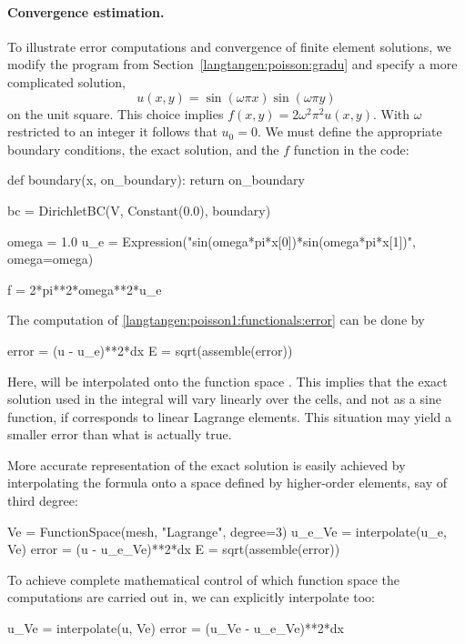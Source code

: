 \paragraph{Convergence estimation.}
To illustrate error computations and convergence of finite element
solutions, we modify the  program from
Section~\ref{langtangen:poisson:gradu} and specify a more complicated
solution,
\begin{equation}
   u(x,y) = \sin(\omega\pi x)\sin(\omega\pi y)
\end{equation}
on the unit square.  This choice implies $f(x,y)=2\omega^2\pi^2 u(x,y)$.
With $\omega$ restricted to an integer it follows that $u_0=0$. We must
define the appropriate boundary conditions, the exact solution, and the
$f$ function in the code:
\begin{python}
def boundary(x, on_boundary):
    return on_boundary

bc = DirichletBC(V, Constant(0.0), boundary)

omega = 1.0
u_e = Expression("sin(omega*pi*x[0])*sin(omega*pi*x[1])",
                 omega=omega)

f = 2*pi**2*omega**2*u_e
\end{python}

\clearpage

The computation of \eqref{langtangen:poisson1:functionals:error} can be
done by
\begin{python}
error = (u - u_e)**2*dx
E = sqrt(assemble(error))
\end{python}
Here,  will be interpolated onto the function
space . This implies that the exact solution used in the integral will
vary linearly over the cells, and not as a sine function, if 
corresponds to linear Lagrange elements.  This situation
may yield a smaller error
 than what is actually true.

More accurate representation of the exact solution is easily achieved by
interpolating the formula onto a space defined by higher-order elements,
say of third degree:
\begin{python}
Ve = FunctionSpace(mesh, "Lagrange", degree=3)
u_e_Ve = interpolate(u_e, Ve)
error = (u - u_e_Ve)**2*dx
E = sqrt(assemble(error))
\end{python}
To achieve complete mathematical
control of which function space the computations are carried out in,
we can explicitly interpolate  too:
\begin{python}
u_Ve = interpolate(u, Ve)
error = (u_Ve - u_e_Ve)**2*dx
\end{python}

